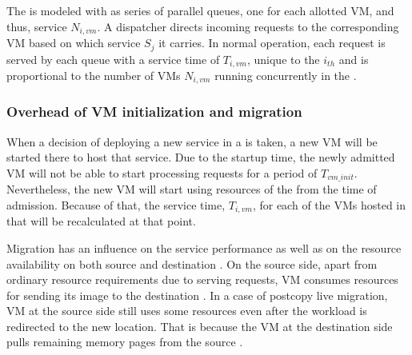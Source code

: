 The \dc{} is modeled with as series of parallel queues, one for each allotted VM, and thus, service $N_{i,vm}$. 
A dispatcher directs incoming requests to the corresponding VM based on which service $S_j$ it carries. 
In normal operation, each request is served by each queue with a service time of $T_{i,vm}$, unique to the $i_{th}$ \dc{} and is proportional to the number of VMs $N_{i,vm}$ running concurrently in the \dc{}.

\subsubsection{Overhead of VM initialization and migration}
When a decision of deploying a new service in a \dc{} is taken, a new VM will be started there to host that service.
Due to the startup time, the newly admitted VM will not be able to start processing requests for a period of $T_{vm\_init}$. 
Nevertheless, the new VM will start using resources of the \dc{} from the time of admission.
Because of that, the service time, $T_{i,vm}$, for each of the VMs hosted in that \dc{} will be recalculated at that point.

Migration has an influence on the service performance as well as on the resource availability on both source and destination \dc{}.
On the source side, apart from ordinary resource requirements due to serving requests, VM consumes resources for sending its image to the destination \dc{}.
In a case of postcopy live migration, VM at the source side still uses some resources even after the workload is redirected to the new location.
That is because the VM at the destination side pulls remaining memory pages from the source \dc{}.


